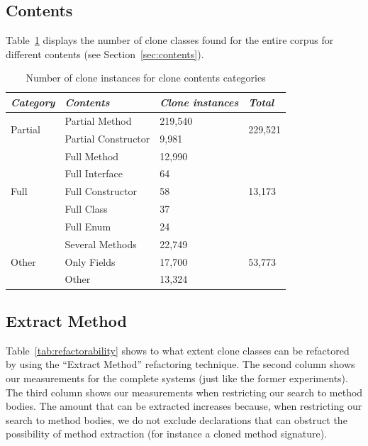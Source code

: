 \subsection{Contents}
Table~\ref{tab:contents} displays the number of clone classes found for the entire corpus for different contents (see Section~\ref{sec:contents}).

\begin{table}[H]
\centering
\begin{tabular}{@{}llll@{}}
\toprule
\textit{\textbf{Category}} & \textit{\textbf{Contents}} & \textit{\textbf{Clone instances}} & \textit{\textbf{Total}} \\ \midrule
\multirow{2}{*}{Partial} & Partial Method & 219,540 & \multirow{2}{*}{229,521} \\ \cmidrule(lr){2-3}
 & Partial Constructor & 9,981 &  \\ \midrule
\multirow{5}{*}{Full} & Full Method & 12,990 & \multirow{5}{*}{13,173} \\ \cmidrule(lr){2-3}
 & Full Interface & 64 &  \\ \cmidrule(lr){2-3}
 & Full Constructor & 58 &  \\ \cmidrule(lr){2-3}
 & Full Class & 37 &  \\ \cmidrule(lr){2-3}
 & Full Enum & 24 &  \\ \midrule
\multirow{3}{*}{Other} & Several Methods & 22,749 & \multirow{3}{*}{53,773} \\ \cmidrule(lr){2-3}
 & Only Fields & 17,700 &  \\ \cmidrule(lr){2-3}
 & Other & 13,324 &  \\ \bottomrule
\end{tabular}
\caption{Number of clone instances for clone contents categories}
\label{tab:contents}
\end{table}

\subsection{Extract Method}
Table~\ref{tab:refactorability} shows to what extent clone classes can be refactored by using the ``Extract Method'' refactoring technique. The second column shows our measurements for the complete systems (just like the former experiments). The third column shows our measurements when restricting our search to method bodies. The amount that can be extracted increases because, when restricting our search to method bodies, we do not exclude declarations that can obstruct the possibility of method extraction (for instance a cloned method signature).

